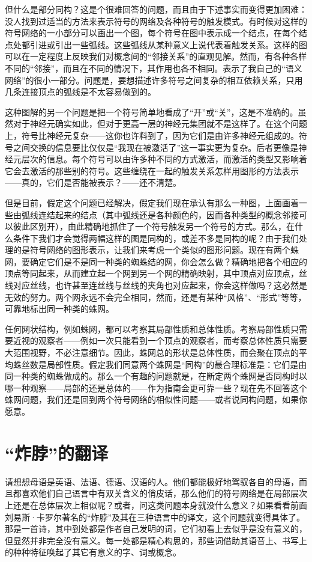 但什么是部分同构？这是个很难回答的问题，而且由于下述事实而变得更加困难：没人找到过适当的方法来表示符号的网络及各种符号的触发模式。有时候对这样的符号网络的一小部分可以画出一个图，每个符号在图中表示成一个结点，在每个结点处都引进或引出一些弧线。这些弧线从某种意义上说代表着触发关系。这样的图可以在一定程度上反映我们对概念间的“邻接关系”的直观见解。然而，有各种各样不同的“邻接”，而且在不同的情况下，其作用也各不相同。表示了我自己的“语义网络”的很小一部分。问题是，要想描述许多符号之间复杂的相互依赖关系，只用几条连接顶点的弧线是不太容易做到的。

这种图解的另一个问题是把一个符号简单地看成了“开”或“关”，这是不准确的。虽然对于神经元确实如此，但对于更高一层的神经元集团就不是这样了。在这个问题上，符号比神经元复杂——这你也许料到了，因为它们是由许多神经元组成的。符号之间交换的信息要比仅仅是“我现在被激活了”这一事实更为复杂。后者更像是神经元层次的信息。每个符号可以由许多种不同的方式激活，而激活的类型又影响着它会去激活的那些别的符号。这些缠绕在一起的触发关系怎样用图形的方法表示——真的，它们是否能被表示？——还不清楚。

但是目前，假定这个问题已经解决，假定我们现在承认有那么一种图，上面画着一些由弧线连结起来的结点（其中弧线还是各种颜色的，因而各种类型的概念邻接可以彼此区别开），由此精确地抓住了一个符号触发另一个符号的方式。那么，在什么条件下我们才会觉得两幅这样的图是同构的，或差不多是同构的呢？由于我们处理的是符号网络的图形表示，让我们来考虑一个类似的图形问题。现在有两个蛛网，要确定它们是不是同一种类的蜘蛛结的网，你会怎么做？精确地把各个相应的顶点等同起来，从而建立起一个网到另一个网的精确映射，其中顶点对应顶点，丝线对应丝线，也许甚至连丝线与丝线的夹角也对应起来，你会这样做吗？这必然是无效的努力。两个网永远不会完全相同，然而，还是有某种“风格”、“形式”等等，可靠地标出同一种类的蛛网。

任何网状结构，例如蛛网，都可以考察其局部性质和总体性质。考察局部性质只需要近视的观察者——例如一次只能看到一个顶点的观察者，而考察总体性质只需要大范围视野，不必注意细节。因此，蛛网总的形状是总体性质，而会聚在顶点的平均蛛丝数是局部性质。假定我们同意两个蛛网是“同构”的最合理标准是：它们是由同一种类的蜘蛛做成的。那么一个有趣的问题就是，在断定两个蛛网是否同构时以哪一种观察——局部的还是总体的——作为指南会更可靠一些？现在先不回答这个蛛网问题，我们还是回到两个符号网络的相似性问题——或者说同构问题，如果你愿意。

\section{“炸脖”的翻译}

请想想母语是英语、法语、德语、汉语的人。他们都能极好地驾驭各自的母语，而且都喜欢他们自己语言中有双关含义的俏皮话，那么他们的符号网络是在局部层次上还是在总体层次上相似呢？或者，问这类问题本身就没什么意义？如果看看前面刘易斯·卡罗尔著名的“炸脖”及其在三种语言中的译文，这个问题就变得具体了。那是一首诗，其中到处都是作者自己发明的词，它们初看上去似乎是没有意义的，但显然并非完全没有意义。每一处都是精心构思的，那些词借助其语音上、书写上的种种特征唤起了其它有意义的字、词或概念。

